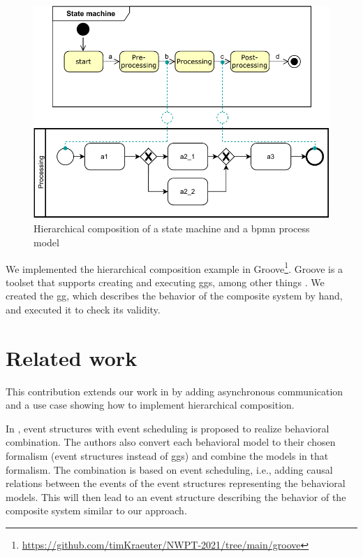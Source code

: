 \documentclass[a4paper]{easychair}
\begin{document}
\begin{figure}[h]
    \centering
    \includegraphics[width=.5\textwidth]{images/usecase.pdf}
    \caption{Hierarchical composition of a state machine and a \gls{bpmn} process model}
    \label{fig:useCase}
\end{figure}
We implemented the hierarchical composition example in Groove\footnote{\url{https://github.com/timKraeuter/NWPT-2021/tree/main/groove}}. %
Groove is a toolset that supports creating and executing \glspl{gg}, among other things \cite{ghamarianModellingAnalysisUsing2012, rensinkGROOVESimulatorTool2004}.
We created the \gls{gg}, which describes the behavior of the composite system by hand, and executed it to check its validity.

\section{Related work}
This contribution extends our work in \cite{krauterBehavioralConsistencyHeterogeneous2021} by adding asynchronous communication and a use case showing how to implement hierarchical composition.

In \cite{kienzleUnifyingFrameworkHomogeneous2019}, event structures with event scheduling is proposed to realize behavioral combination.
The authors also convert each behavioral model to their chosen formalism (event structures instead of \glspl{gg}) and combine the models in that formalism.
The combination is based on event scheduling, i.e., adding causal relations between the events of the event structures representing the behavioral models.
This will then lead to an event structure describing the behavior of the composite system similar to our approach.


\end{document}
